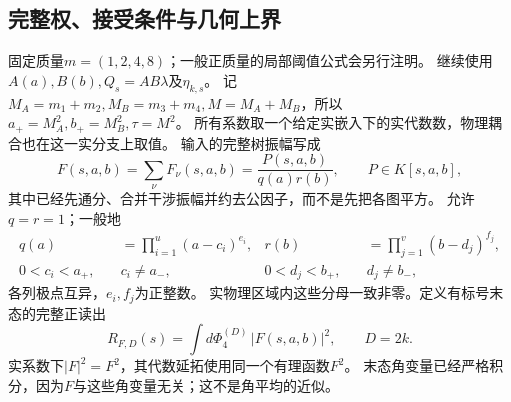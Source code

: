 \documentclass[11pt,a4paper]{ctexart}
\theoremstyle{cnplain}\newtheorem{theorem}{定理}[section]
\theoremstyle{definition}\newtheorem{definition}[theorem]{定义}
\theoremstyle{remark}\newtheorem{remark}[theorem]{注}
\begin{document}
\subsection{完整权、接受条件与几何上界}
固定质量$m=(1,2,4,8)$；一般正质量的局部阈值公式会另行注明。
继续使用$A(a),B(b),Q_s=A B\lambda$及$\eta_{k,s}$。
记$M_A=m_1+m_2,M_B=m_3+m_4,M=M_A+M_B$，所以
$a_+=M_A^2,b_+=M_B^2,\tau=M^2$。
所有系数取一个给定实嵌入下的实代数数，物理耦合也在这一实分支上取值。
输入的完整树振幅写成
\begin{equation}\label{eq:weightedamplitude}
 F(s,a,b)=\sum_\nu F_\nu(s,a,b)
       =\frac{P(s,a,b)}{q(a)r(b)},\qquad P\in K[s,a,b],
\end{equation}
其中已经先通分、合并干涉振幅并约去公因子，而不是先把各图平方。
允许$q=r=1$；一般地
\begin{align}
 q(a)&=\prod_{i=1}^{u}(a-c_i)^{e_i},&
 r(b)&=\prod_{j=1}^{v}(b-d_j)^{f_j},\label{eq:weightedpoles}\\
 0<c_i<a_+,\quad &c_i\ne a_-,&
 0<d_j<b_+,\quad &d_j\ne b_-,
\end{align}
各列极点互异，$e_i,f_j$为正整数。
实物理区域内这些分母一致非零。定义有标号末态的完整正读出
\begin{equation}\label{eq:weightedrate}
 R_{F,D}(s)=\int d\Phi_4^{(D)}\,|F(s,a,b)|^2,\qquad D=2k.
\end{equation}
实系数下$|F|^2=F^2$，其代数延拓使用同一个有理函数$F^2$。
末态角变量已经严格积分，因为$F$与这些角变量无关；这不是角平均的近似。
\end{document}
